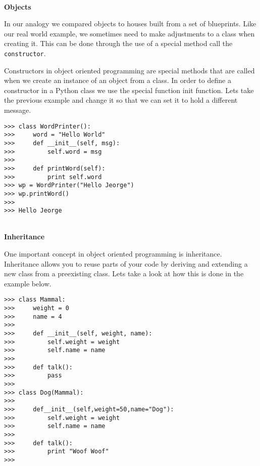 \documentclass[letterpaper,11pt]{article}
\begin{document}
\\
\textbf{Objects}
\par{In our analogy we compared objects to houses built from a set of
blueprints.  Like our real world example, we sometimes need to make adjustments
to a class when creating it. This can be done through the use of a special
method call the \texttt{constructor}.}
\par{Constructors in object oriented programming are special methods that are
    called when we create an instance of an object from a class. In order to
    define a constructor in a Python class we use the special function init
    function.  Lets take the previous example and change it so that we can set
it to hold a different message.}
\\
\begin{minipage}{.5\textwidth}
    \begin{tcolorbox}
        \begin{footnotesize}
            \begin{verbatim}
>>> class WordPrinter():
>>>     word = "Hello World"
>>>     def __init__(self, msg):
>>>         self.word = msg
>>>
>>>     def printWord(self):
>>>         print self.word
>>> wp = WordPrinter("Hello Jeorge")
>>> wp.printWord()
>>>
>>> Hello Jeorge
            \end{verbatim}
        \end{footnotesize}
    \end{tcolorbox}
\end{minipage}
\\
\textbf{Inheritance}
\par{One important concept in object oriented programming is inheritance.
Inheritance allows you to reuse parts of your code by deriving and extending a
new class from a preexisting class. Lets take a look at how this is done in the
example below.}
\\
\begin{minipage}{.5\textwidth}
    \begin{tcolorbox}
        \begin{footnotesize}
            \begin{verbatim}
>>> class Mammal:
>>>     weight = 0
>>>     name = 4
>>>
>>>     def __init__(self, weight, name):
>>>         self.weight = weight
>>>         self.name = name
>>>
>>>     def talk():
>>>         pass
>>>
>>> class Dog(Mammal):
>>>
>>>     def__init__(self,weight=50,name="Dog"):
>>>         self.weight = weight
>>>         self.name = name
>>>
>>>     def talk():
>>>         print "Woof Woof"
>>>
                \end{verbatim}
            \end{footnotesize}
        \end{tcolorbox}
    \end{minipage}
\end{document}
